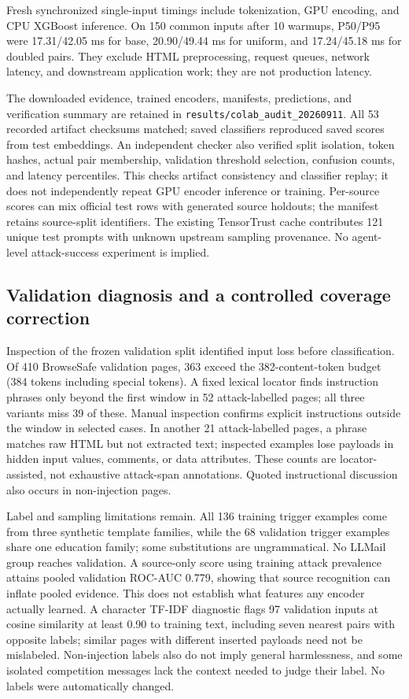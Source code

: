 \documentclass[11pt, a4paper]{article}
\begin{document}
Fresh synchronized single-input timings include tokenization, GPU encoding,
and CPU XGBoost inference. On 150 common inputs after 10 warmups, P50/P95
were 17.31/42.05 ms for base, 20.90/49.44 ms for uniform, and 17.24/45.18 ms
for doubled pairs. They exclude HTML preprocessing, request queues, network
latency, and downstream application work; they are not production latency.

The downloaded evidence, trained encoders, manifests, predictions, and
verification summary are retained in
\texttt{results/colab\_audit\_20260911}. All 53 recorded artifact checksums
matched; saved classifiers reproduced saved scores from test embeddings.
An independent checker also verified split isolation, token hashes, actual
pair membership, validation threshold selection, confusion counts, and
latency percentiles. This checks artifact consistency and classifier replay;
it does not independently repeat GPU encoder inference or training.
Per-source scores can mix official test rows with generated source holdouts;
the manifest retains source-split identifiers. The existing TensorTrust
cache contributes 121 unique test prompts with unknown upstream sampling
provenance. No agent-level attack-success experiment is implied.

\subsection{Validation diagnosis and a controlled coverage correction}
Inspection of the frozen validation split identified input loss before
classification. Of 410 BrowseSafe validation pages, 363 exceed the
382-content-token budget (384 tokens including special tokens). A fixed
lexical locator finds instruction phrases only beyond the first window in
52 attack-labelled pages; all three variants miss 39 of these. Manual
inspection confirms explicit instructions outside the window in selected
cases. In another 21 attack-labelled pages, a phrase matches raw HTML but
not extracted text; inspected examples lose payloads in hidden input
values, comments, or data attributes. These counts are locator-assisted,
not exhaustive attack-span annotations. Quoted instructional discussion
also occurs in non-injection pages.

Label and sampling limitations remain. All 136 training trigger examples
come from three synthetic template families, while the 68 validation
trigger examples share one education family; some substitutions are
ungrammatical. No LLMail group reaches validation. A source-only score
using training attack prevalence attains pooled validation ROC-AUC 0.779,
showing that source recognition can inflate pooled evidence. This does
not establish what features any encoder actually learned. A character
TF-IDF diagnostic flags 97 validation inputs at cosine similarity at least
0.90 to training text, including seven nearest pairs with opposite labels;
similar pages with different inserted payloads need not be mislabeled.
Non-injection labels also do not imply general harmlessness, and some
isolated competition messages lack the context needed to judge their label.
No labels were automatically changed.
\end{document}
